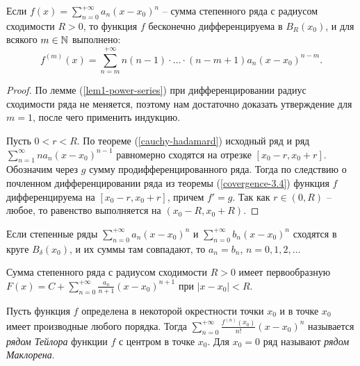 \begin{theorem}
    \label{th1-power-series}
    Если $f(x) = \sum_{n = 0}^{+\infty} a_{n}(x - x_{0})^{n}$ -- сумма степенного ряда с радиусом сходимости $R > 0$, то функция $f$ бесконечно дифференцируема в $B_{R}(x_{0})$, и для всякого $m \in \mathbb{N}$ выполнено:
    \[f^{(m)}(x) = \sum_{n = m}^{+\infty}n(n-1)\cdot\ldots\cdot(n - m + 1) a_{n}(x - x_{0})^{n - m}.\]
\end{theorem}

\begin{proof}
    По лемме (\ref{lem1-power-series}) при дифференцировании радиус сходимости ряда не меняется, поэтому нам достаточно доказать утверждение для $m = 1$, после чего применить индукцию. 

    Пусть $0 < r < R$. По теореме (\ref{cauchy-hadamard}) исходный ряд и ряд $\sum_{n = 1}^{\infty}n a_{n}(x - x_{0})^{n - 1}$ равномерно сходятся на отрезке $[x_{0} - r, x_{0} + r]$. Обозначим через $g$ сумму продифференцированного ряда. Тогда по следствию о почленном дифференцировании ряда из теоремы (\ref{covergence-3.4}) функция $f$ дифференцируема на $[x_{0} - r, x_{0} + r]$, причем $f' = g$. Так как $r \in (0, R)$ -- любое, то равенство выполняется на $(x_{0} - R, x_{0} + R)$.
\end{proof}

\begin{corollary}
    Если степенные ряды $\sum_{n = 0}^{+\infty} a_{n}(x - x_{0})^{n}$ и $\sum_{n = 0}^{+\infty} b_{n}(x - x_{0})^{n}$ сходятся в круге $B_{\delta}(x_{0})$, и их суммы там совпадают, то $a_{n} = b_{n}$, $n = 0, 1, 2, \ldots$
\end{corollary}

\begin{corollary}
    \label{cor2-power-series}
    Сумма степенного ряда с радиусом сходимости $R > 0$ имеет первообразную $F(x) = C + \sum_{n = 0}^{+\infty} \frac{a_{n}}{n + 1}(x - x_{0})^{n + 1}$ при $|x - x_{0}| < R$.
\end{corollary}

\begin{definition}
    Пусть функция $f$ определена в некоторой окрестности точки $x_{0}$ и в точке $x_{0}$ имеет производные любого порядка. Тогда $\sum_{n = 0}^{+\infty} \frac{f^{(n)}(x_{0})}{n!}(x - x_{0})^{n}$ называется \textit{рядом Тейлора} функции $f$ с центром в точке $x_{0}$. Для $x_{0} = 0$ ряд называют \textit{рядом Маклорена}.
\end{definition}

